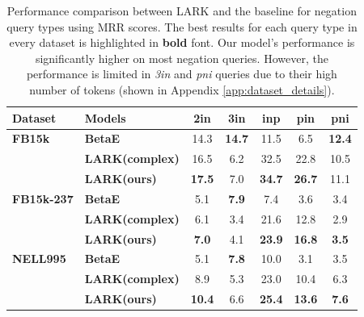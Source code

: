 \documentclass{article} %
\newcommand{\model}{LARK}
\begin{document}
\begin{table}[htbp]
\small
\centering
\vspace{-1em}
\caption{Performance comparison between {\model} and the baseline for negation query types using MRR scores. The best results for each query type in every dataset is highlighted in \textbf{bold} font. {Our model's performance is significantly higher on most negation queries. However, the performance is limited in \textit{3in} and \textit{pni} queries due to their high number of tokens (shown in Appendix \ref{app:dataset_details}).}}
\begin{tabular}{l|l|ccccc}
\hline
\textbf{Dataset} & \textbf{Models} & \textbf{2in}        & \textbf{3in}  & \textbf{inp}  & \textbf{pin}  & \textbf{pni}  \\\hline
\textbf{FB15k}  &   \textbf{BetaE} & 14.3       & \textbf{14.7} & 11.5 & 6.5  & \textbf{12.4} \\
&\textbf{{\model}(complex)} &16.5&6.2&32.5&22.8&10.5     \\
&\textbf{{\model}(ours)} & \textbf{17.5}&7.0&\textbf{34.7}&\textbf{26.7}&11.1\\\hline
\textbf{FB15k-237} & \textbf{BetaE}        & 5.1        & \textbf{7.9}  & 7.4  & 3.6  & 3.4  \\
&\textbf{{\model}(complex)}     & 6.1&3.4&21.6&12.8&2.9\\
&\textbf{{\model}(ours)}        & \textbf{7.0}&4.1&\textbf{23.9}&\textbf{16.8}&\textbf{3.5}\\\hline
\textbf{NELL995} & \textbf{BetaE}  & 5.1        & \textbf{7.8}  & 10.0   & 3.1  & 3.5  \\
&\textbf{{\model}(complex)}  &8.9&5.3&23.0&10.4&6.3\\
&\textbf{{\model}(ours)} &\textbf{10.4}&6.6&\textbf{25.4}&\textbf{13.6}&\textbf{7.6}\\\hline
\end{tabular}
\vspace{-1em}
\label{tab:mrr_negation}
\end{table}
\end{document}
